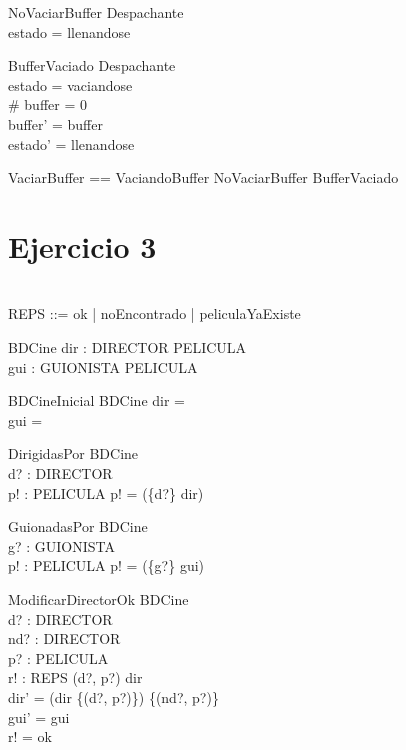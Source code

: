\documentclass[11pt]{article}
\begin{document}
\begin{schema}{NoVaciarBuffer}
\Xi Despachante \\
\where
estado = llenandose
\end{schema}

\begin{schema}{BufferVaciado}
\Delta Despachante \\
\where
estado = vaciandose \\
\# buffer = 0 \\
buffer' = buffer \\
estado' = llenandose
\end{schema}

\begin{zed}
VaciarBuffer == VaciandoBuffer \lor NoVaciarBuffer \lor BufferVaciado
\end{zed}

\section*{Ejercicio 3}

\begin{zed}
   \\
  REPS ::= ok | noEncontrado | peliculaYaExiste
 \end{zed}
 
 \begin{schema}{BDCine}
 dir : DIRECTOR \rel PELICULA \\
 gui : GUIONISTA \rel PELICULA
 \end{schema}
 
 \begin{schema}{BDCineInicial}
 BDCine
 \where
 dir = \emptyset \\
 gui = \emptyset
 \end{schema}
 
 \begin{schema}{DirigidasPor}
 \Xi BDCine \\
 d? : DIRECTOR \\
 p! : \power PELICULA
 \where
 p! = \ran (\{d?\} \dres dir)
 \end{schema}
 
 \begin{schema}{GuionadasPor}
 \Xi BDCine \\
 g? : GUIONISTA \\
 p! : \power PELICULA
 \where
 p! = \ran (\{g?\} \dres gui)
 \end{schema}
 
 \begin{schema}{ModificarDirectorOk}
 \Delta BDCine \\
 d? : DIRECTOR \\
 nd? : DIRECTOR \\
 p? : PELICULA \\
 r! : REPS 
 \where
 (d?, p?) \in dir \\
 dir' = (dir \setminus \{(d?, p?)\}) \cup \{(nd?, p?)\} \\
 gui' = gui \\
 r! = ok
 \end{schema}
 
\end{document}
